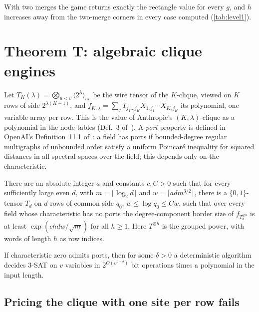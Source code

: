 \documentclass[10pt]{amsart}
\theoremstyle{plain}
\theoremstyle{definition}
\theoremstyle{remark}
\numberwithin{equation}{section}
\begin{document}
With two merges the game returns exactly the rectangle value for every $g$, and $h$ increases away from
the two-merge corners in every case computed (\cref{tab:level1}).

\section{Theorem T: algebraic clique engines}\label{sec:thmT}

Let $T_K(\lambda)=\bigotimes_{u<v}\langle2^\lambda\rangle_{uv}$ be the wire tensor of the $K$-clique, viewed on
$K$ rows of side $2^{\lambda(K-1)}$, and $f_{K,\lambda}=\sum_jT_{j_1\dots j_K}X_{1,j_1}\cdots X_{K,j_K}$ its
polynomial, one variable array per row. This is the value of Anthropic's $(K,\lambda)$-clique as a
polynomial in the node tables (Def.~3 of~\cite{AnthropicETH}). A \emph{port} property is defined in
OpenAI's Definition~11.1 of~\cite{OpenAIEG}: a field has ports if bounded-degree regular multigraphs of
unbounded order satisfy a uniform Poincar\'e inequality for squared distances in all spectral spaces over
the field; this depends only on the characteristic.

\begin{imported}\label{imp:HC}
There are an absolute integer $a$ and constants $c,C>0$ such that for every sufficiently large even $d$,
with $m=\lceil\log_2d\rceil$ and $w=\lceil adm^{3/2}\rceil$, there is a $\{0,1\}$-tensor $T_d$ on $d$ rows of
common side $q_0$, $w\le\log q_0\le Cw$, such that over every field whose characteristic has no ports the
degree-component border size of $f_{T_d^{\otimes h}}$ is at least $\exp(chdw/\sqrt m)$ for all $h\ge1$. Here
$T^{\otimes h}$ is the grouped power, with words of length $h$ as row indices.
\end{imported}

\begin{imported}\label{imp:IM}
If characteristic zero admits ports, then for some $\delta>0$ a deterministic algorithm decides 3-SAT on $v$
variables in $2^{O(v^{1-\delta})}$ bit operations times a polynomial in the input length.
\end{imported}

\subsection{Pricing the clique with one site per row fails}
\end{document}
